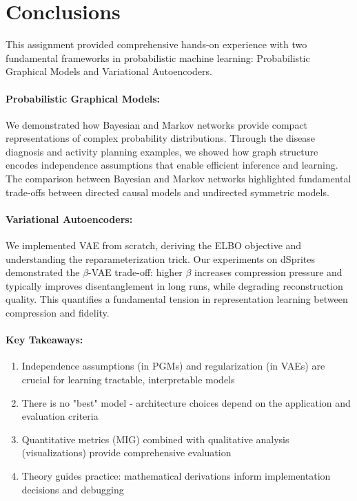 \documentclass[conference]{IEEEtran}
\begin{document}
\section{Conclusions}

This assignment provided comprehensive hands-on experience with two fundamental frameworks in probabilistic machine learning: Probabilistic Graphical Models and Variational Autoencoders.

\paragraph{Probabilistic Graphical Models:} We demonstrated how Bayesian and Markov networks provide compact representations of complex probability distributions. Through the disease diagnosis and activity planning examples, we showed how graph structure encodes independence assumptions that enable efficient inference and learning. The comparison between Bayesian and Markov networks highlighted fundamental trade-offs between directed causal models and undirected symmetric models.

\paragraph{Variational Autoencoders:} We implemented VAE from scratch, deriving the ELBO objective and understanding the reparameterization trick. Our experiments on dSprites demonstrated the $\beta$-VAE trade-off: higher $\beta$ increases compression pressure and typically improves disentanglement in long runs, while degrading reconstruction quality. This quantifies a fundamental tension in representation learning between compression and fidelity.

\paragraph{Key Takeaways:}
\begin{enumerate}
    \item Independence assumptions (in PGMs) and regularization (in VAEs) are crucial for learning tractable, interpretable models
    \item There is no "best" model - architecture choices depend on the application and evaluation criteria
    \item Quantitative metrics (MIG) combined with qualitative analysis (visualizations) provide comprehensive evaluation
    \item Theory guides practice: mathematical derivations inform implementation decisions and debugging
\end{enumerate}
\end{document}
